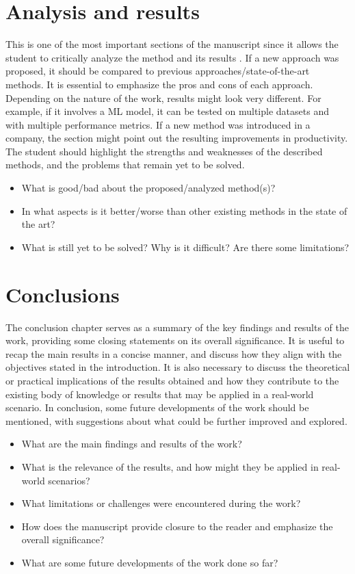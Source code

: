 \chapter{Analysis and results}
This is one of the most important sections of the manuscript since it allows the student to critically analyze the method and its results . If a new approach was proposed, it should be compared to previous approaches/state-of-the-art methods. It is essential to emphasize the pros and cons of each approach. Depending on the nature of the work, results might look very different. For example, if it involves a ML model, it can be tested on multiple datasets and with multiple performance metrics. If a new method was introduced in a company, the section might point out the resulting improvements in productivity. The student should highlight the strengths and weaknesses of the described methods, and the problems that remain yet to be solved.

\begin{itemize}
    \item What is good/bad about the proposed/analyzed method(s)?
    \item In what aspects is it better/worse than other existing methods in the state of the art?
    \item What is still yet to be solved? Why is it difficult? Are there some limitations?
\end{itemize}

\chapter{Conclusions}
The conclusion chapter serves as a summary of the key findings and results of the work, providing some closing statements on its overall significance. It is useful to recap the main results in a concise manner, and discuss how they align with the objectives stated in the introduction. It is also necessary to discuss the theoretical or practical implications of the results obtained and how they contribute to the existing body of knowledge or results that may be applied in a real-world scenario. In conclusion, some future developments of the work should be mentioned, with suggestions about what could be further improved and explored.

\begin{itemize}
    \item What are the main findings and results of the work?
    \item What is the relevance of the results, and how might they be applied in real-world scenarios?
    \item What limitations or challenges were encountered during the work?
    \item How does the manuscript provide closure to the reader and emphasize the overall significance?
    \item What are some future developments of the work done so far?
\end{itemize}
